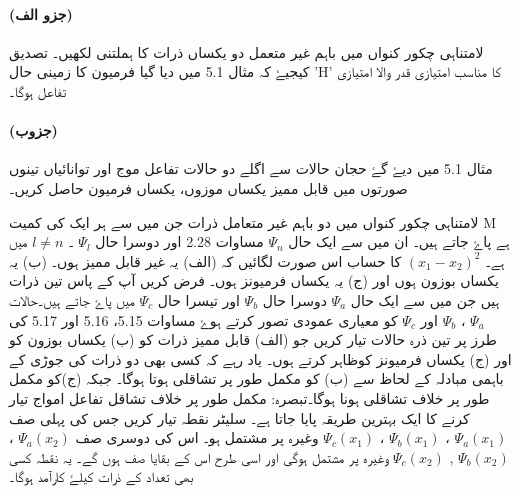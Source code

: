 \paragraph*{(جزو الف)}
لامتناہی چکور کنواں میں باہم غیر متعمل دو یکساں ذرات کا ہملتنی لکھیں۔ تصدیق کیجیۓ کہ مثال 5.1 میں دیا گیا فرمیون کا زمینی حال 'H' کا مناسب امتیازی قدر والا امتیازی تفاعل ہوگا۔ 
\paragraph*{(جزوب)}
مثال 5.1 میں دیۓ گۓ حجان حالات سے اگلے دو حالات تفاعل موج اور توانائیاں تینوں صورتوں میں قابل ممیز یکساں موزوں، یکساں فرمیون حاصل کریں۔




لامتناہی چکور کنواں میں دو باہم غیر متعامل ذرات جن میں سے ہر ایک کی کمیت M ہے پاۓ جاتے ہیں۔ ان میں سے ایک حال $ \Psi_{n} $ مساوات 2.28 اور دوسرا حال $  \Psi _{l} $ ۔ $ l\neq n $  میں ہے۔ $ (x_{1} - x_{2})^2 $ کا حساب اس صورت لگائیں کہ (الف) یہ غیر قابل ممیز ہوں۔ (ب) یہ یکساں بوزون ہوں اور (ج) یہ یکساں فرمیونز ہوں۔
فرض کریں آپ کے پاس تین ذرات ہیں جن میں سے ایک حال $ \Psi_{a} $ دوسرا حال $ \Psi_{b} $ اور تیسرا حال $ \Psi_{c} $ میں پاۓ جاتے ہیں۔حالات $ \Psi_{a} $ ، $ \Psi_{b} $ اور $ \Psi_{c} $ کو معیاری عمودی تصور کرتے ہوۓ مساوات 5.15، 5.16 اور 5.17 کی طرز پر تین ذرہ حالات تیار کریں جو (الف) قابل ممیز ذرات کو (ب) یکساں بوزون کو اور (ج) یکساں فرمیونز کوظاہر کرتے ہوں۔ یاد رہے کہ کسی بھی دو ذرات کی جوڑی کے باہمی مبادلہ کے لحاظ سے (ب) کو مکمل طور پر تشاقلی ہوتا ہوگا۔ جبکہ (ج)کو مکمل طور پر خلاف تشاقلی ہونا ہوگا۔تبصرہ: مکمل طور پر خلاف تشاقل تفاعل امواج تیار کرنے کا ایک بہترین طریقہ پایا جاتا ہے۔ سلیٹر نقطہ تیار کریں جس کی پہلی صف  $ \Psi_{a}(x_{1}) $ ، $ \Psi_{b}(x_{1}) $ ، $ \Psi_{c}(x_{1}) $ وغیرہ پر مشتمل ہو۔ اس کی دوسری صف $ \Psi_{a}(x_{2}) $ ، $ \Psi_{b}(x_{2}) $ , $ \Psi_{c}(x_{2}) $ وغیرہ پر مشتمل ہوگی اور اسی طرح اس کے بقایا صف ہوں گے۔ یہ نقطہ کسی بھی تعداد کے ذرات کیلۓ کارآمد ہوگا۔

